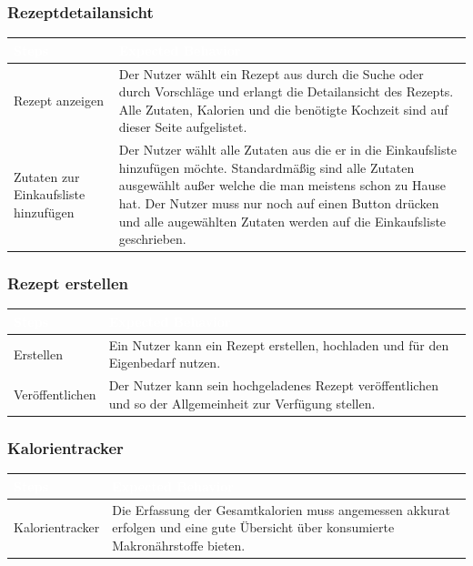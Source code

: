\documentclass[12pt]{article}
\theoremstyle{definition}
\begin{document}
\subsubsection{Rezeptdetailansicht}
\begin{tabular}{|p{.3\linewidth}|p{.7\linewidth}|}
\hline
\cellcolor[gray]{0.5}\textcolor{white}{Steps} & \cellcolor[gray]{0.5}\textcolor{white}{Expected Behavior} \\ \hline
Rezept anzeigen&Der Nutzer wählt ein Rezept aus durch die Suche oder durch Vorschläge und erlangt die Detailansicht des Rezepts. Alle Zutaten, Kalorien und die benötigte Kochzeit sind auf dieser Seite aufgelistet.\\\hline
Zutaten zur Einkaufsliste hinzufügen&Der Nutzer wählt alle Zutaten aus die er in die Einkaufsliste hinzufügen möchte. Standardmäßig sind alle Zutaten ausgewählt außer welche die man meistens schon zu Hause hat. Der Nutzer muss nur noch auf einen Button drücken und alle augewählten Zutaten werden auf die Einkaufsliste geschrieben.\\\hline
\end{tabular}

\subsubsection{Rezept erstellen}
\begin{tabular}{|p{.3\linewidth}|p{.7\linewidth}|}
\hline
\cellcolor[gray]{0.5}\textcolor{white}{Steps} & \cellcolor[gray]{0.5}\textcolor{white}{Expected Behavior}\\ \hline
Erstellen & Ein Nutzer kann ein Rezept erstellen, hochladen und für den Eigenbedarf nutzen. \\\hline
Veröffentlichen & Der Nutzer kann sein hochgeladenes Rezept veröffentlichen und so der Allgemeinheit zur Verfügung stellen.\\\hline
\end{tabular}
\subsubsection{Kalorientracker}
\begin{tabular}{|p{.3\linewidth}|p{.7\linewidth}|}
\hline
\cellcolor[gray]{0.5}\textcolor{white}{Steps} & \cellcolor[gray]{0.5}\textcolor{white}{Expected Behavior} \\ \hline
Kalorientracker&Die Erfassung der Gesamtkalorien muss angemessen akkurat erfolgen und eine gute Übersicht über konsumierte Makronährstoffe bieten. \\\hline
\end{tabular}
\end{document}
